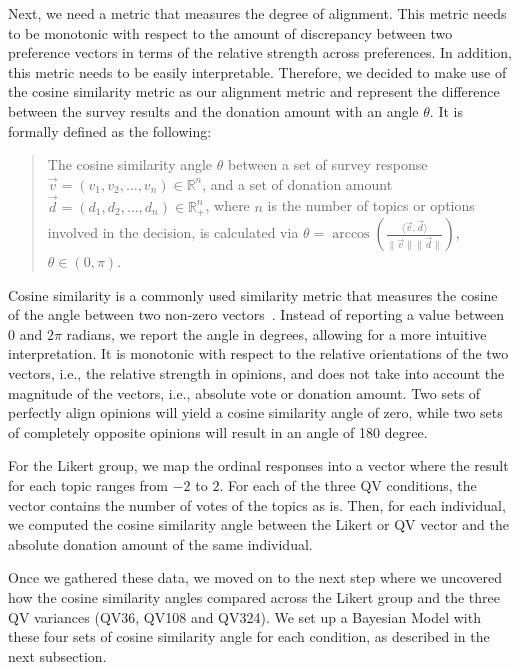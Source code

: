 Next, we need a metric that measures the degree of alignment. This metric needs to be monotonic with respect to the amount of discrepancy between two preference vectors in terms of the relative strength across preferences. In addition, this metric needs to be easily interpretable. Therefore, we decided to make use of the cosine similarity metric as our alignment metric and represent the difference between the survey results and the donation amount with an angle $\theta$. It is formally defined as the following:

\begin{quote}
    The cosine similarity angle $\theta$ between a set of survey response $\vec{v} = (v_1, v_2,\dots, v_n) \in \mathbb{R}^n$, and a set of donation amount $\vec{d} = (d_1, d_2,\dots, d_n) \in \mathbb{R}_{+}^n$, where $n$ is the number of topics or options involved in the decision, is calculated via $\theta = \arccos \left ( {\frac{\langle \vec{v},  \vec{d} \rangle}{\|\vec{v}\| \|\vec{d}\|}} \right )$, $\theta \in (0, \pi)$.
\end{quote}

Cosine similarity is a commonly used similarity metric 
that measures the cosine of the angle between two non-zero vectors~\cite{singhal2001modern}. Instead of reporting a value between $0$ and $2 \pi$ radians, we report the angle in degrees, allowing for a more intuitive interpretation.
It is monotonic with respect to the relative orientations of the two vectors, i.e., the relative strength in opinions, and does not take into account the magnitude of the vectors, i.e., absolute vote or donation amount. Two sets of perfectly align opinions will yield a cosine similarity angle of zero, while two sets of completely opposite opinions will result in an angle of 180 degree.

For the Likert group, we map the ordinal responses into a vector where the result for each topic ranges from $-2$ to $2$. For each of the three QV conditions, the vector contains the number of votes of the topics as is. Then, for each individual, we computed the cosine similarity angle between the Likert or QV vector and the absolute donation amount of the same individual. 

Once we gathered these data, we moved on to the next step where we uncovered how the cosine similarity angles compared across the Likert group and the three QV variances (QV36, QV108 and QV324). We set up a Bayesian Model with these four sets of cosine similarity angle for each condition, as described in the next subsection.

